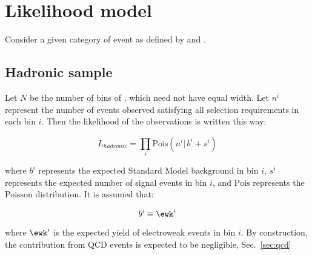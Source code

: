 \clearpage
\section{Likelihood model}
\label{sec:statistics}

Consider a given category of event as defined by \njet and \nb.

\subsection{Hadronic sample}
\label{sec:hadronicLikelihood}

Let $N$ be the number of bins of \HT, which need not have equal width.
Let $n^i$ represent the number of events observed satisfying all
selection requirements in each \HT bin $i$.  Then the likelihood of
the observations is written this way:

\begin{equation}
L_{hadronic}=\prod_i \mathrm{Pois}(n^i |\, b^i + s^i)
\label{eq:hadronicLikelihood}
\end{equation}

where $b^i$ represents the expected Standard Model background in bin
$i$, $s^i$ represents the expected number of signal events in bin $i$,
and $\mathrm{Pois}$ represents the Poisson distribution.  It is
assumed that:

\begin{equation}
  b^i\equiv \ewk^i
  \label{eq:ewkTotal}
\end{equation}

where $\ewk^i$ is the expected yield of electroweak events in bin $i$.
By construction, the contribution from QCD events is expected to be negligible, 
Sec.~\ref{sec:qcd}


